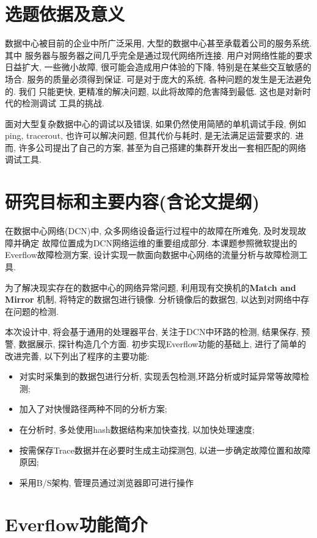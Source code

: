 
\chapter{选题依据及意义}

数据中心被目前的企业中所广泛采用,
大型的数据中心甚至承载着公司的服务系统. 其中
服务器与服务器之间几乎完全是通过现代网络所连接.
用户对网络性能的要求日益扩大, 一些微小故障, 很可能会造成用户体验的下降,
特别是在某些交互敏感的场合. 服务的质量必须得到保证. 可是对于庞大的系统,
各种问题的发生是无法避免的. 我们 只能更快, 更精准的解决问题,
以此将故障的危害降到最低. 这也是对新时代的检测调试 工具的挑战.

面对大型复杂数据中心的调试以及错误, 如果仍然使用简陋的单机调试手段,
例如ping, tracerout, 也许可以解决问题, 但其代价与耗时,
是无法满足运营要求的. 进而, 许多公司提出了自己的方案,
甚至为自己搭建的集群开发出一套相匹配的网络调试工具.

\chapter{研究目标和主要内容(含论文提纲)}

在数据中心网络(DCN)中, 众多网络设备运行过程中的故障在所难免,
及时发现故障并确定 故障位置成为DCN网络运维的重要组成部分.
本课题参照微软提出的Everflow故障检测方案,
设计实现一款面向数据中心网络的流量分析与故障检测工具.

为了解决现实存在的数据中心的网络异常问题, 利用现有交换机的\textbf{Match and
Mirror} 机制, 将特定的数据包进行镜像. 分析镜像后的数据包,
以达到对网络中存在问题的检测.

本次设计中, 将会基于通用的处理器平台, 关注于DCN中环路的检测, 结果保存,
预警, 数据展示, 探针构造几个方面. 初步实现Everflow功能的基础上,
进行了简单的改进完善, 以下列出了程序的主要功能:

\begin{itemize}
\item
  对实时采集到的数据包进行分析,
  实现丢包检测,环路分析或时延异常等故障检测;
\item
  加入了对快慢路径两种不同的分析方案;
\item
  在分析时, 多处使用hash数据结构来加快查找, 以加快处理速度;
\item
  按需保存Trace数据并在必要时生成主动探测包,
  以进一步确定故障位置和故障原因;
\item
  采用B/S架构, 管理员通过浏览器即可进行操作
\end{itemize}

\chapter{Everflow功能简介}

